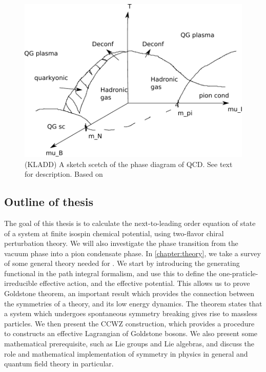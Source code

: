 \begin{figure}
    \centering
    \includegraphics[]{figurer/phase_diagram.pdf}
    \caption{(KLADD) A sketch scetch of the phase diagram of QCD. See text for description. Based on~\cite{from_hadrons_to_quarks,
    Brandt:QCD_phase_diagram_with_isospin_chemical_potential,Brandt:QCD_phase_diagram_for_nonzero_isospin-asymmetry,Fukushima:The_phase_diagram_of_dense_QCD,mannarelli:meson_condensation}
    }
    \label{fig:phase diag qcd}
\end{figure}

\subsection*{Outline of thesis}
The goal of this thesis is to calculate the next-to-leading order equation of state of a system at finite isospin chemical potential, using two-flavor chiral perturbation theory.
We will also investigate the phase transition from the vacuum phase into a pion condensate phase.
In \autoref{chapter:theory}, we take a survey of some general theory needed for \chpt.
We start by introducing the generating functional in the path integral formalism, and use this to define the one-praticle-irreducible effective action, and the effective potential.
This allows us to prove Goldstone theorem, an important result which provides the connection between the symmetries of a theory, and its low energy dynamics.
The theorem states that a system which undergoes spontaneous symmetry breaking gives rise to massless particles.
We then present the CCWZ construction, which provides a procedure to constructs an effective Lagrangian of Goldstone bosons.
We also present some mathematical prerequisite, such as Lie groups and Lie algebras, and discuss the role and mathematical implementation of symmetry in physics in general and quantum field theory in particular.

